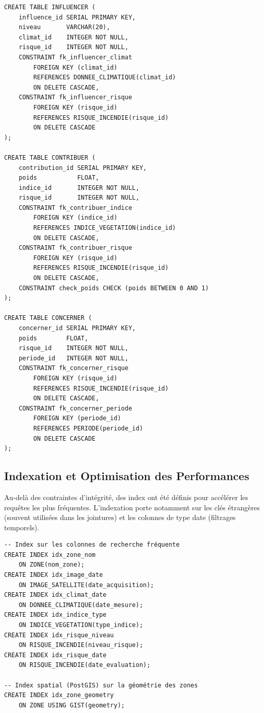 \documentclass[12pt,a4paper]{report}
\begin{document}
\begin{verbatim}
CREATE TABLE INFLUENCER (
    influence_id SERIAL PRIMARY KEY,
    niveau       VARCHAR(20),
    climat_id    INTEGER NOT NULL,
    risque_id    INTEGER NOT NULL,
    CONSTRAINT fk_influencer_climat
        FOREIGN KEY (climat_id)
        REFERENCES DONNEE_CLIMATIQUE(climat_id)
        ON DELETE CASCADE,
    CONSTRAINT fk_influencer_risque
        FOREIGN KEY (risque_id)
        REFERENCES RISQUE_INCENDIE(risque_id)
        ON DELETE CASCADE
);

CREATE TABLE CONTRIBUER (
    contribution_id SERIAL PRIMARY KEY,
    poids           FLOAT,
    indice_id       INTEGER NOT NULL,
    risque_id       INTEGER NOT NULL,
    CONSTRAINT fk_contribuer_indice
        FOREIGN KEY (indice_id)
        REFERENCES INDICE_VEGETATION(indice_id)
        ON DELETE CASCADE,
    CONSTRAINT fk_contribuer_risque
        FOREIGN KEY (risque_id)
        REFERENCES RISQUE_INCENDIE(risque_id)
        ON DELETE CASCADE,
    CONSTRAINT check_poids CHECK (poids BETWEEN 0 AND 1)
);

CREATE TABLE CONCERNER (
    concerner_id SERIAL PRIMARY KEY,
    poids        FLOAT,
    risque_id    INTEGER NOT NULL,
    periode_id   INTEGER NOT NULL,
    CONSTRAINT fk_concerner_risque
        FOREIGN KEY (risque_id)
        REFERENCES RISQUE_INCENDIE(risque_id)
        ON DELETE CASCADE,
    CONSTRAINT fk_concerner_periode
        FOREIGN KEY (periode_id)
        REFERENCES PERIODE(periode_id)
        ON DELETE CASCADE
);
\end{verbatim}

\subsection{Indexation et Optimisation des Performances}

Au-delà des contraintes d'intégrité, des index ont été définis pour accélérer les requêtes les plus fréquentes. L'indexation porte notamment sur les clés étrangères (souvent utilisées dans les jointures) et les colonnes de type date (filtrages temporels).

\begin{verbatim}
-- Index sur les colonnes de recherche fréquente
CREATE INDEX idx_zone_nom
    ON ZONE(nom_zone);
CREATE INDEX idx_image_date
    ON IMAGE_SATELLITE(date_acquisition);
CREATE INDEX idx_climat_date
    ON DONNEE_CLIMATIQUE(date_mesure);
CREATE INDEX idx_indice_type
    ON INDICE_VEGETATION(type_indice);
CREATE INDEX idx_risque_niveau
    ON RISQUE_INCENDIE(niveau_risque);
CREATE INDEX idx_risque_date
    ON RISQUE_INCENDIE(date_evaluation);

-- Index spatial (PostGIS) sur la géométrie des zones
CREATE INDEX idx_zone_geometry
    ON ZONE USING GIST(geometry);
\end{verbatim}
\end{document}
